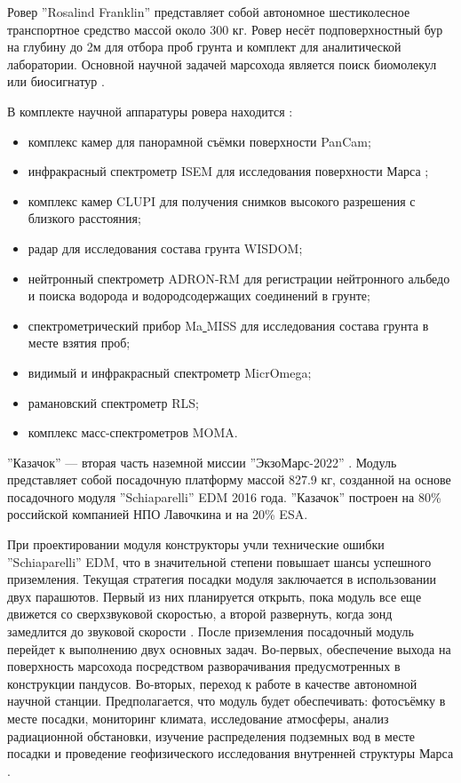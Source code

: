 \documentclass{mipt-thesis-bs}
\begin{document}
	 	Ровер ''Rosalind Franklin'' представляет собой автономное шестиколесное транспортное средство массой около 300 кг. Ровер несёт подповерхностный бур на глубину до 2м для отбора проб грунта и комплект для аналитической лаборатории. Основной научной задачей марсохода является поиск биомолекул или биосигнатур \cite{poulakis2015overview}.
	 
	 	В комплекте научной аппаратуры ровера находится \cite{IKI}:
	 	\begin{itemize}
	 		\item комплекс камер для панорамной съёмки поверхности PanCam;
	 		\item инфракрасный спектрометр ISEM для исследования поверхности Марса \cite{korablev2017infrared};
	 		\item комплекс камер CLUPI  для получения снимков высокого разрешения с близкого расстояния;
	 		\item радар для исследования состава грунта WISDOM;
	 		\item нейтронный спектрометр ADRON-RM для регистрации нейтронного альбедо и поиска водорода и водородсодержащих соединений в грунте;
	 		\item спектрометрический прибор Ma\underline{ }MISS для исследования состава грунта в месте взятия проб;
	 		\item видимый и инфракрасный спектрометр MicrOmega;
	 		\item рамановский спектрометр RLS; 
	 		\item комплекс масс-спектрометров MOMA.
	 \end{itemize}


''Казачок'' ---  вторая часть наземной миссии ''ЭкзоМарс-2022'' \cite{Esakazachok}. Модуль представляет собой посадочную платформу массой 827.9 кг, созданной на основе посадочного модуля ''Schiaparelli'' EDM 2016 года. ''Казачок'' построен на 80\% российской компанией НПО Лавочкина и на 20\% ESA.
 
При проектировании модуля конструкторы учли технические ошибки ''Schiaparelli'' EDM, что в значительной степени повышает шансы успешного приземления. Текущая стратегия посадки модуля заключается в использовании двух парашютов. Первый из них планируется открыть, пока модуль все еще движется со сверхзвуковой скоростью, а второй развернуть, когда зонд замедлится до звуковой скорости \cite{BBC}. После приземления посадочный модуль перейдет к выполнению двух основных задач. Во-первых, обеспечение выхода на поверхность марсохода посредством разворачивания предусмотренных в конструкции пандусов.  Во-вторых, переход к работе в качестве автономной научной станции. Предполагается, что модуль будет обеспечивать: фотосъёмку в месте посадки, мониторинг климата, исследование атмосферы, анализ радиационной обстановки, изучение распределения подземных вод в месте посадки и проведение геофизического исследования внутренней структуры Марса \cite{IKI}.
\end{document}
